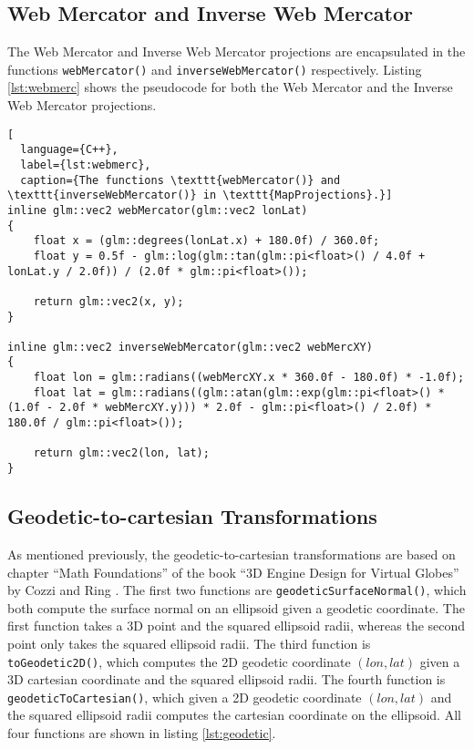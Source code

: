 \subsection{Web Mercator and Inverse Web Mercator}
The Web Mercator and Inverse Web Mercator projections
are encapsulated in the functions \texttt{webMercator()}
and \texttt{inverseWebMercator()} respectively.
Listing \ref{lst:webmerc} shows the pseudocode 
for both the Web Mercator and the Inverse Web Mercator projections.

\begin{lstlisting}[
  language={C++},
  label={lst:webmerc},
  caption={The functions \texttt{webMercator()} and \texttt{inverseWebMercator()} in \texttt{MapProjections}.}]
inline glm::vec2 webMercator(glm::vec2 lonLat)
{
    float x = (glm::degrees(lonLat.x) + 180.0f) / 360.0f;
    float y = 0.5f - glm::log(glm::tan(glm::pi<float>() / 4.0f + lonLat.y / 2.0f)) / (2.0f * glm::pi<float>());

    return glm::vec2(x, y);
}

inline glm::vec2 inverseWebMercator(glm::vec2 webMercXY)
{
    float lon = glm::radians((webMercXY.x * 360.0f - 180.0f) * -1.0f);
    float lat = glm::radians((glm::atan(glm::exp(glm::pi<float>() * (1.0f - 2.0f * webMercXY.y))) * 2.0f - glm::pi<float>() / 2.0f) * 180.0f / glm::pi<float>());

    return glm::vec2(lon, lat);
}
\end{lstlisting}

\subsection{Geodetic-to-cartesian Transformations}
As mentioned previously, the geodetic-to-cartesian transformations
are based on chapter ``Math Foundations''
of the book ``3D Engine Design for Virtual Globes''
by Cozzi and Ring \cite[p.~13]{3denginedesignforvirtualglobes}.
The first two functions are 
\texttt{geodeticSurfaceNormal()},
which both compute the surface normal on an ellipsoid 
given a geodetic coordinate. The first function takes a 
3D point and the squared ellipsoid radii, whereas the second point 
only takes the squared ellipsoid radii.
The third function is \texttt{toGeodetic2D()},
which computes the 2D geodetic coordinate $(lon,lat)$ given a 3D
cartesian coordinate and the squared ellipsoid radii.
The fourth function is 
\texttt{geodeticToCartesian()},
which given a 2D geodetic coordinate $(lon,lat)$ and 
the squared ellipsoid radii computes the cartesian coordinate on the ellipsoid.
All four functions are shown in listing \ref{lst:geodetic}.

